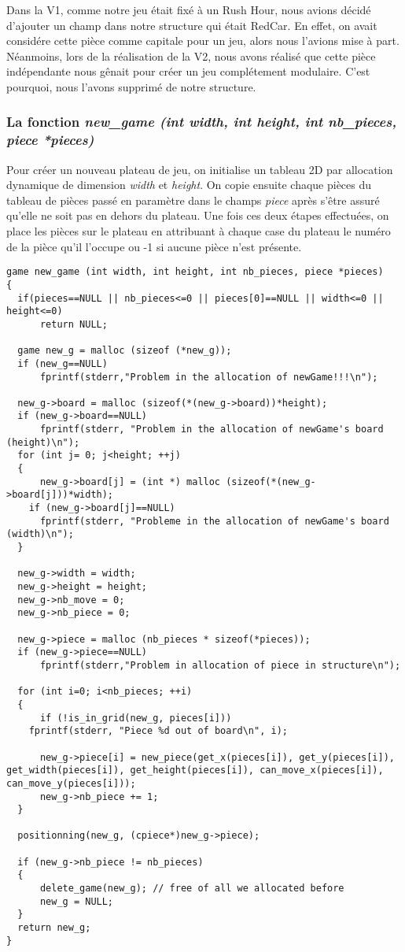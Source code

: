 \documentclass{report}
\begin{document}
Dans la V1, comme notre jeu était fixé à un Rush Hour, nous avions décidé d'ajouter un champ dans notre structure qui était RedCar. En effet, on avait considére cette pièce comme capitale pour un jeu, alors nous l'avions mise à part. Néanmoins, lors de la réalisation de la V2, nous avons réalisé que cette pièce indépendante nous gênait pour créer un jeu complétement modulaire. C'est pourquoi, nous l'avons supprimé de notre structure.
\subsubsection{La fonction \textit{new\_game (int width, int height, int nb\_pieces, piece *pieces)}}
Pour créer un nouveau plateau de jeu, on initialise un tableau 2D par allocation dynamique de dimension \textit{width} et \textit{height}. On copie ensuite chaque pièces du tableau de pièces passé en paramètre dans le champs \textit{piece} après s'être assuré qu'elle ne soit pas en dehors du plateau. Une fois ces deux étapes effectuées, on place les pièces sur le plateau en attribuant à chaque case du plateau le numéro de la pièce qu'il l'occupe ou -1 si aucune pièce n'est présente.
\begin{lstlisting}
game new_game (int width, int height, int nb_pieces, piece *pieces)
{
  if(pieces==NULL || nb_pieces<=0 || pieces[0]==NULL || width<=0 || height<=0)
      return NULL;

  game new_g = malloc (sizeof (*new_g));
  if (new_g==NULL)
      fprintf(stderr,"Problem in the allocation of newGame!!!\n");

  new_g->board = malloc (sizeof(*(new_g->board))*height);
  if (new_g->board==NULL)
      fprintf(stderr, "Problem in the allocation of newGame's board (height)\n");
  for (int j= 0; j<height; ++j)
  {
      new_g->board[j] = (int *) malloc (sizeof(*(new_g->board[j]))*width);
    if (new_g->board[j]==NULL)
      fprintf(stderr, "Probleme in the allocation of newGame's board (width)\n");
  }

  new_g->width = width;
  new_g->height = height;
  new_g->nb_move = 0;
  new_g->nb_piece = 0;

  new_g->piece = malloc (nb_pieces * sizeof(*pieces));
  if (new_g->piece==NULL)
      fprintf(stderr,"Problem in allocation of piece in structure\n");
     
  for (int i=0; i<nb_pieces; ++i)
  {
      if (!is_in_grid(new_g, pieces[i]))
	fprintf(stderr, "Piece %d out of board\n", i);

      new_g->piece[i] = new_piece(get_x(pieces[i]), get_y(pieces[i]), get_width(pieces[i]), get_height(pieces[i]), can_move_x(pieces[i]), can_move_y(pieces[i]));
      new_g->nb_piece += 1;
  }

  positionning(new_g, (cpiece*)new_g->piece);

  if (new_g->nb_piece != nb_pieces)
  {
      delete_game(new_g); // free of all we allocated before
      new_g = NULL;
  }
  return new_g;
}
\end{lstlisting}
\end{document}
